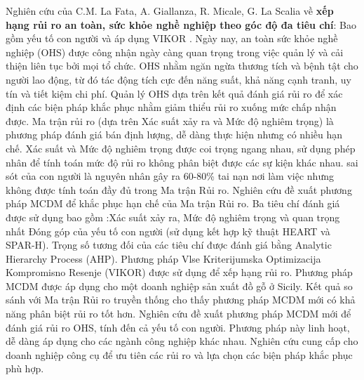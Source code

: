 Nghiên cứu của C.M. La Fata, A. Giallanza, R. Micale, G. La Scalia về \textbf{xếp hạng rủi ro an toàn, sức khỏe nghề nghiệp theo góc độ đa tiêu chí}: Bao gồm yếu tố con người và áp dụng VIKOR \cite{sciencedirect3}. Ngày nay, an toàn sức khỏe nghề nghiệp (OHS) được công nhận ngày càng quan trọng trong việc quản lý và cải thiện liên tục bởi mọi tổ chức. OHS nhằm ngăn ngừa thương tích và bệnh tật cho người lao động, từ đó tác động tích cực đến năng suất, khả năng cạnh tranh, uy tín và tiết kiệm chi phí.  Quản lý OHS dựa trên kết quả đánh giá rủi ro để xác định các biện pháp khắc phục nhằm giảm thiểu rủi ro xuống mức chấp nhận được. Ma trận rủi ro (dựa trên Xác suất xảy ra và Mức độ nghiêm trọng) là phương pháp đánh giá bán định lượng, dễ dàng thực hiện nhưng có nhiều hạn chế. Xác suất và Mức độ nghiêm trọng được coi trọng ngang nhau, sử dụng phép nhân để tính toán mức độ rủi ro không phân biệt được các sự kiện khác nhau. sai sót của con người là nguyên nhân gây ra 60-80\% tai nạn nơi làm việc nhưng không được tính toán đầy đủ trong Ma trận Rủi ro. Nghiên cứu đề xuất phương pháp MCDM để khắc phục hạn chế của Ma trận Rủi ro. Ba tiêu chí đánh giá được sử dụng bao gồm :Xác suất xảy ra, Mức độ nghiêm trọng và quan trọng nhất Đóng góp của yếu tố con người (sử dụng kết hợp kỹ thuật HEART và SPAR-H). Trọng số tương đối của các tiêu chí được đánh giá bằng Analytic Hierarchy Process (AHP). Phương pháp Vlse Kriterijumska Optimizacija Kompromisno Resenje (VIKOR) được sử dụng để xếp hạng rủi ro. Phương pháp MCDM được áp dụng cho một doanh nghiệp sản xuất đồ gỗ ở Sicily. Kết quả so sánh với Ma trận Rủi ro truyền thống cho thấy phương pháp MCDM mới có khả năng phân biệt rủi ro tốt hơn. Nghiên cứu đề xuất phương pháp MCDM mới để đánh giá rủi ro OHS, tính đến cả yếu tố con người. Phương pháp này linh hoạt, dễ dàng áp dụng cho các ngành công nghiệp khác nhau. Nghiên cứu cung cấp cho doanh nghiệp công cụ để ưu tiên các rủi ro và lựa chọn các biện pháp khắc phục phù hợp.

